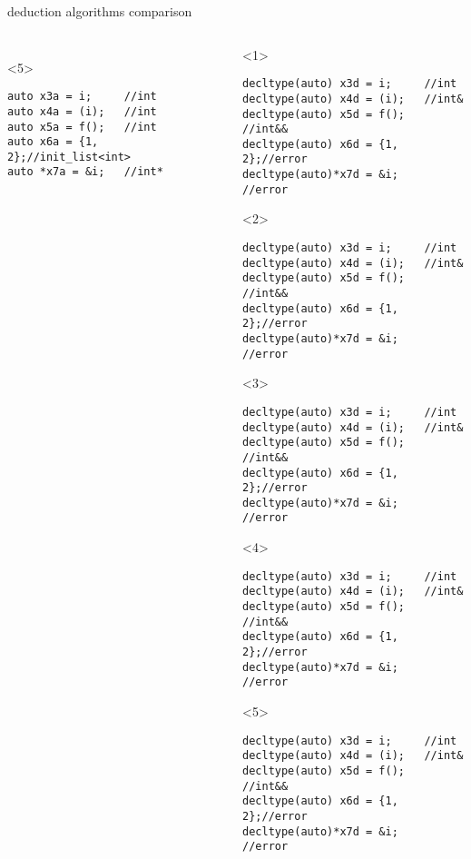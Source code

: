 \documentclass[10pt]{beamer}
\begin{document}
\begin{frame}[fragile]{deduction algorithms comparison}
\begin{columns}
\begin{column}{0.48\linewidth}
\begin{onlyenv}
\begin{verbatim}
		\end{verbatim}
	\end{onlyenv}
	\begin{onlyenv}
		\begin{verbatim}
auto x3a = i;     //int
auto x4a = (i);   //int
auto x5a = f();   //int
auto x6a = {1, 2};//init_list<int>
auto *x7a = &i;   //int*
		\end{verbatim}
	\end{onlyenv}
	\end{column}
	\begin{column}{0.48\linewidth}
	\begin{onlyenv}
	\begin{verbatim}
decltype(auto) x3d = i;     //int
decltype(auto) x4d = (i);   //int&
decltype(auto) x5d = f();   //int&&
decltype(auto) x6d = {1, 2};//error
decltype(auto)*x7d = &i;    //error
	\end{verbatim}
	\end{onlyenv}
	\begin{onlyenv}
	\begin{verbatim}
decltype(auto) x3d = i;     //int
decltype(auto) x4d = (i);   //int&
decltype(auto) x5d = f();   //int&&
decltype(auto) x6d = {1, 2};//error
decltype(auto)*x7d = &i;    //error
	\end{verbatim}
	\end{onlyenv}
	\begin{onlyenv}
	\begin{verbatim}
decltype(auto) x3d = i;     //int
decltype(auto) x4d = (i);   //int&
decltype(auto) x5d = f();   //int&&
decltype(auto) x6d = {1, 2};//error
decltype(auto)*x7d = &i;    //error
	\end{verbatim}
	\end{onlyenv}
	\begin{onlyenv}
	\begin{verbatim}
decltype(auto) x3d = i;     //int
decltype(auto) x4d = (i);   //int&
decltype(auto) x5d = f();   //int&&
decltype(auto) x6d = {1, 2};//error
decltype(auto)*x7d = &i;    //error
	\end{verbatim}
	\end{onlyenv}
	\begin{onlyenv}
	\begin{verbatim}
decltype(auto) x3d = i;     //int
decltype(auto) x4d = (i);   //int&
decltype(auto) x5d = f();   //int&&
decltype(auto) x6d = {1, 2};//error
decltype(auto)*x7d = &i;    //error
	\end{verbatim}
	\end{onlyenv}			
	\end{column}
	\end{columns}
\end{frame}
\end{document}
